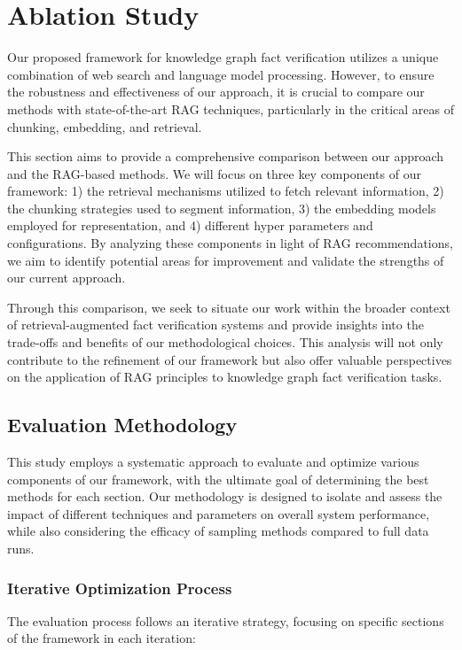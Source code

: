 \chapter{Ablation Study}
\label{ch:ablation}
Our proposed framework for knowledge graph fact verification utilizes a unique combination of web search and language model processing.
However, to ensure the robustness and effectiveness of our approach, it is crucial to compare our methods with state-of-the-art RAG techniques, particularly in the critical areas of chunking, embedding, and retrieval.

This section aims to provide a comprehensive comparison between our approach and the RAG-based methods.
We will focus on three key components of our framework: 1) the retrieval mechanisms utilized to fetch relevant information, 2) the chunking strategies used to segment information, 3) the embedding models employed for representation, and 4) different hyper parameters and configurations.
By analyzing these components in light of RAG recommendations, we aim to identify potential areas for improvement and validate the strengths of our current approach.

Through this comparison, we seek to situate our work within the broader context of retrieval-augmented fact verification systems and provide insights into the trade-offs and benefits of our methodological choices.
This analysis will not only contribute to the refinement of our framework but also offer valuable perspectives on the application of RAG principles to knowledge graph fact verification tasks.
\section{Evaluation Methodology}\label{sec:evaluation-methodology}
This study employs a systematic approach to evaluate and optimize various components of our framework, with the ultimate goal of determining the best methods for each section.
Our methodology is designed to isolate and assess the impact of different techniques and parameters on overall system performance, while also considering the efficacy of sampling methods compared to full data runs.

\subsection{Iterative Optimization Process}\label{subsec:iterative-optimization-process}
The evaluation process follows an iterative strategy, focusing on specific sections of the framework in each iteration:

